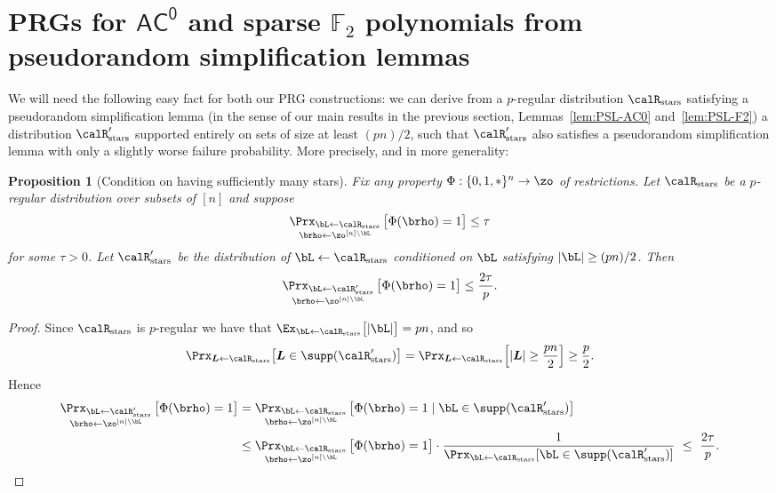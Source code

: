 \documentclass[11pt]{article}
\numberwithin{equation}{section}
\newtheorem{proposition}[theorem]{Proposition}
\theoremstyle{definition}
\theoremstyle{plain}
\theoremstyle{plain}
\newcommand{\acz}{\mathsf{AC^0}}
\newcommand{\stars}{\mathrm{stars}}
\renewcommand{\F}{\mathds{F}}
\begin{document}
\section{PRGs for $\acz$ and sparse $\F_2$ polynomials from pseudorandom simplification lemmas} \label{sec:puttogether}

We will need the following easy fact for both our PRG constructions: we can derive from a $p$-regular distribution $\calR_\stars$ satisfying a pseudorandom simplification lemma (in the sense of our main results in the previous section, Lemmas~\ref{lem:PSL-AC0} and~\ref{lem:PSL-F2}) a distribution $\calR_\stars'$ supported entirely on sets of size at least $(pn)/2$, such that $\calR_\stars'$ also satisfies a pseudorandom simplification lemma with only a slightly worse failure probability.  More precisely, and in more generality:

\begin{proposition}[Condition on having sufficiently many stars]
\label{prop:condition} 
Fix any property $\Phi : \{0,1,\ast\}^n \to \zo$ of restrictions. 
Let $\calR_\stars$ be a $p$-regular distribution over subsets of $[n]$ and suppose  
\[ \mathop{\Prx_{\bL\leftarrow\calR_\stars}}_{\brho\leftarrow\zo^{[n]\setminus \bL}} \big[ \Phi(\brho) = 1 \big] \le \tau \]
for some $\tau > 0$.   Let $\calR_\stars'$ be the distribution of $\bL\leftarrow\calR_\stars$ conditioned on $\bL$ satisfying $|\bL| \ge (pn)/2$. Then 
\[ \mathop{\Prx_{\bL\leftarrow\calR_\stars'}}_{\brho\leftarrow\zo^{[n]\setminus \bL}} \big[ \Phi(\brho) = 1 \big] \le \frac{2\tau}{p}. \]
 \end{proposition} 

\begin{proof} 
Since $\calR_\stars$ is $p$-regular we have that $\Ex_{\bL\leftarrow\calR_\stars} \big[|\bL|\big] = pn$, and so
\[ \Prx_{\boldsymbol{L}\leftarrow\calR_\stars}\big[\boldsymbol{L} \in \supp(\calR_\stars')\big]  = \Prx_{\boldsymbol{L}\leftarrow\calR_\stars}\Big[|\boldsymbol{L}| \ge \frac{pn}{2}\Big] \ge \frac{p}{2}.\] 
Hence 
\begin{align*}
 \mathop{\Prx_{\bL\leftarrow\calR_\stars'}}_{\brho\leftarrow\zo^{[n]\setminus \bL}}\big[\Phi(\brho)=1\big]  
& =  \mathop{\Prx_{\bL\leftarrow\calR_\stars}}_{\brho\leftarrow\zo^{[n]\setminus \bL}}\big[\Phi(\brho)=1 \mid \bL \in\supp(\calR_\stars')\big]  \\
& \le  \mathop{\Prx_{\bL\leftarrow\calR_\stars}}_{\brho\leftarrow\zo^{[n]\setminus \bL}}\big[\Phi(\brho)=1\big] \cdot  \frac1{\Prx_{\bL\leftarrow\calR_\stars}[\bL \in \supp(\calR_\stars')]} \ \le \ \frac{2\tau}{p}. \qedhere
\end{align*}
\end{proof} 
\end{document}
